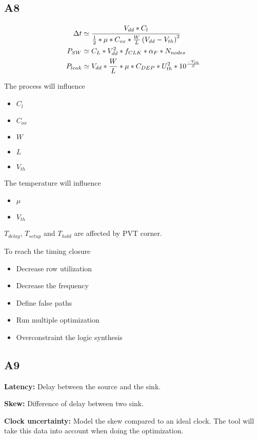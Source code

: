 \subsection{A8}

\begin{align}
  \Delta t &\simeq \cfrac{V_{dd} * C_l}{\frac{1}{2}*\mu*C_{ox} * \frac{W}{L}\left(V_{dd} - V_{th}\right)^2}\\
 P_{SW} &\simeq C_L * V_{dd}^2 * f_{CLK} * \alpha_F * N_{nodes}\\
 P_{leak}&\simeq V_{dd} * \frac{W}{L} * \mu * C_{DEP} * U_{th}^2 * 10^{\frac{-V_{th}}{S}}
\end{align}

The process will influence
\begin{itemize}
  \item \(C_l\)
  \item \(C_{ox}\)
  \item \(W\)
  \item \(L\)
  \item \(V_{th}\)
\end{itemize}

The temperature will influence
\begin{itemize}
  \item \(\mu\)
  \item \(V_{th}\)
\end{itemize}


\bigbreak
\(T_{delay}\), \(T_{setup}\) and \(T_{hold}\) are affected by PVT corner.

\bigbreak
To reach the timing closure
\begin{itemize}
  \item Decrease row utilization
  \item Decrease the frequency
  \item Define false paths
  \item Run multiple optimization
  \item Overconstraint the logic synthesis
\end{itemize}


\subsection{A9}

\textbf{Latency:} Delay between the source and the sink.

\textbf{Skew:} Difference of delay between two sink.

\textbf{Clock uncertainty:} Model the skew compared to an ideal clock. The tool will take this data into account when doing the optimization.

